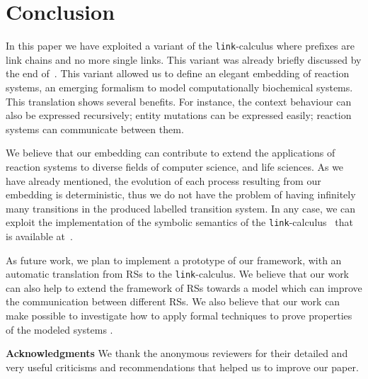 
\section{Conclusion}\label{sec:conclusion}

In this paper we have exploited a variant of the {\tt link}-calculus
where prefixes are link chains and no more single links. This variant was already briefly discussed by the end of~\cite{BBB17}.
This variant allowed us to define 
an elegant embedding of reaction systems,
an emerging formalism to model computationally biochemical systems.
This translation shows several benefits.
For instance, the context behaviour can also be expressed recursively;
entity mutations can be expressed easily; reaction systems can
communicate between them.

We believe that our embedding can contribute to extend the applications
of reaction systems to diverse fields of computer science, and life
sciences.
As we have already mentioned, the evolution of each process resulting from our embedding 
is deterministic, thus we do not have the problem of having infinitely many transitions
in the produced labelled transition system. 
In any case, we can exploit the implementation of  the symbolic semantics of the {\tt link}-calculus~\cite{BrodoO17} that is available at~\cite{tool}.


As future work, we plan to implement a prototype of our framework,
with an automatic translation from RSs to the {\tt link}-calculus. 
We believe that our work can also help to extend the framework
of RSs towards a model which can improve the communication
between different RSs. We also believe that our work can make 
possible to investigate how to apply formal techniques to prove 
properties of the
modeled systems 
\cite{CFHOT15,OCHF16,BBGLBH2017,FOP15,CFOP10}.

\medskip

\noindent
{\small {\bf Acknowledgments}
We thank the anonymous reviewers for their detailed and very useful 
criticisms and recommendations that helped us to improve our paper.}
